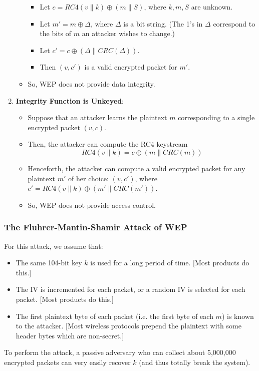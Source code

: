 \documentclass[12pt,titlepage]{article}
\begin{document}
\begin{enumerate}
\begin{itemize}
\begin{itemize}
\item Let $c = RC4(v\|k) \oplus (m\|S)$, where $k, m, S$ are unknown.
\item Let $m' = m \oplus \Delta $, where $\Delta$ is a bit string. (The 1’s in $\Delta$ correspond to the bits of $m$ an attacker wishes to change.)
\item Let $c' = c \oplus (\Delta \| CRC(\Delta))$.
\item Then $(v, c')$ is a valid encrypted packet for $m'$.
\end{itemize}
\item So, WEP does not provide data integrity.
\end{itemize}
\item \textbf{Integrity Function is Unkeyed}: \begin{itemize}
\item Suppose that an attacker learns the plaintext $m$ corresponding to a single encrypted packet $(v, c)$.
\item Then, the attacker can compute the RC4 keystream $$RC4(v\|k) = c \oplus (m\|CRC(m))$$
\item Henceforth, the attacker can compute a valid encrypted packet for any plaintext $m'$ of her choice: $(v, c')$, where $c' = RC4(v\|k) \oplus (m'\|CRC(m'))$. 
\item So, WEP does not provide access control.
\end{itemize}
\end{enumerate}

\subsubsection{The Fluhrer-Mantin-Shamir Attack of WEP}
For this attack, we assume that: \begin{itemize}
\item The same 104-bit key $k$ is used for a long period of time. [Most products do this.]
\item The IV is incremented for each packet, or a random IV is selected for each packet. [Most products do this.]
\item The first plaintext byte of each packet (i.e. the first byte of each $m$) is known to the attacker.
[Most wireless protocols prepend the plaintext with some header bytes which are non-secret.]
\end{itemize}

To perform the attack, a passive adversary who can collect about 5,000,000 encrypted packets can very easily recover $k$ (and thus totally break the system).
\end{document}
